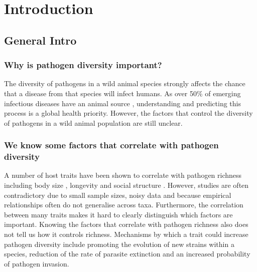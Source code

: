 
\clearpage
\section{Introduction}





\subsection{General Intro}


\subsubsection{Why is pathogen diversity important?}

The diversity of pathogens in a wild animal species strongly affects the chance that a disease from that species will infect humans.
As over 50\% of emerging infectious diseases have an animal source  \cite{jones2008global}, understanding and predicting this process is a global health priority.
However, the factors that control the diversity of pathogens in a wild animal population are still unclear.


\subsubsection{We know some factors that correlate with pathogen diversity}
A number of host traits have been shown to correlate with pathogen richness including body size  \cite{kamiya2014determines}, longevity  \cite{} and social structure \cite{}.
However, studies are often contradictory due to small sample sizes, noisy data and because empirical relationships often do not generalise across taxa.
Furthermore, the correlation between many traits makes it hard to clearly distinguish which factors are important.
Knowing the factors that correlate with pathogen richness also does not tell us how it controls richness. 
Mechanisms by which a trait could increase pathogen diversity include promoting the evolution of new strains within a species, reduction of the rate of parasite extinction and an increased probability of pathogen invasion.



